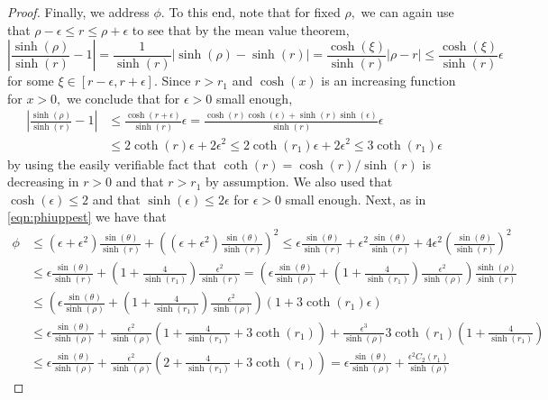 \documentclass[10pt,a4paper]{amsart}
\begin{document}
\begin{proof}
Finally, we address $\phi.$ To this end, note that for fixed $\rho,$ 
we can again use that $\rho-\epsilon \leq r \leq \rho +\epsilon$ to 
see that by the mean value theorem,
\[
\left|\frac{\sinh(\rho)}{\sinh(r)}-1\right|
=\frac{1}{\sinh(r)} |\sinh(\rho)-\sinh(r)|
=\frac{\cosh(\xi)}{\sinh(r)}|\rho-r|
\leq\frac{\cosh(\xi)}{\sinh(r)} \epsilon
\]
for some $\xi\in [r-\epsilon,r+\epsilon].$ Since $r>r_1$ 
and $\cosh(x)$ is an increasing function for $x>0,$ we conclude that for 
$\epsilon>0$ small enough,
\begin{align} \label{eqn:sinhratio}
\left|\frac{\sinh(\rho)}{\sinh(r)}-1\right|
& \leq\frac{\cosh(r+\epsilon)}{\sinh(r)} \epsilon
=\frac{\cosh(r) \cosh(\epsilon)+\sinh(r)\sinh(\epsilon)}{\sinh(r)} \epsilon \\
& \leq 2\coth(r)\epsilon+2\epsilon^2 
\leq 2\coth(r_1)\epsilon+2\epsilon^2 
\leq 3\coth(r_1)\epsilon
\nonumber
\end{align}
by using the easily verifiable fact that $\coth(r)=\cosh(r)/\sinh(r)$ is decreasing in $r>0$
and that $r>r_1$ by assumption. We also used that $\cosh(\epsilon)\leq 2$ and that 
$\sinh(\epsilon)\leq 2 \epsilon$ for $\epsilon>0$ small enough.
Next, as in \eqref{eqn:phiuppest} we have that 
\begin{align*} 
 \phi& \leq (\epsilon+\epsilon^2)\frac{\sin(\theta)}{\sinh(r)}
+\left((\epsilon+\epsilon^2)\frac{\sin(\theta)}{\sinh(r)}\right)^2
\leq \epsilon\frac{\sin(\theta)}{\sinh(r)} +\epsilon^{2}\frac{\sin(\theta)}{\sinh(r)} 
+4\epsilon^2\left(\frac{\sin(\theta)}{\sinh(r)} \right)^2\\
& \leq \epsilon\frac{\sin(\theta)}{\sinh(r)}
+\left(1+\frac{4}{\sinh(r_1)}\right)\frac{\epsilon^2}{\sinh(r)}
=\left(\epsilon\frac{\sin(\theta)}{\sinh(\rho)}
+\left(1+\frac{4}{\sinh(r_1)}\right)\frac{\epsilon^2}{\sinh(\rho)}\right)\frac{\sinh(\rho)}{\sinh(r)}
\nonumber \\
& \leq \left(\epsilon\frac{\sin(\theta)}{\sinh(\rho)}
+\left(1+\frac{4}{\sinh(r_1)}\right)\frac{\epsilon^2}{\sinh(\rho)}\right)
\left(1+3\coth(r_1)\epsilon\right) \\
& \leq  \epsilon\frac{\sin(\theta)}{\sinh(\rho)}
+\frac{\epsilon^2}{\sinh(\rho)}\left(1+\frac{4}{\sinh(r_1)}+3\coth(r_1)\right)
+\frac{\epsilon^3}{\sinh(\rho)}3\coth(r_1)\left(1+\frac{4}{\sinh(r_1)}\right)
\nonumber \\
& \leq \epsilon\frac{\sin(\theta)}{\sinh(\rho)}
+\frac{\epsilon^2}{\sinh(\rho)}\left(2+\frac{4}{\sinh(r_1)}+3\coth(r_1)\right)
=\epsilon\frac{\sin(\theta)}{\sinh(\rho)}
+\frac{\epsilon^2C_2(r_1)}{\sinh(\rho)}

\end{align*}
\end{proof}
\end{document}
